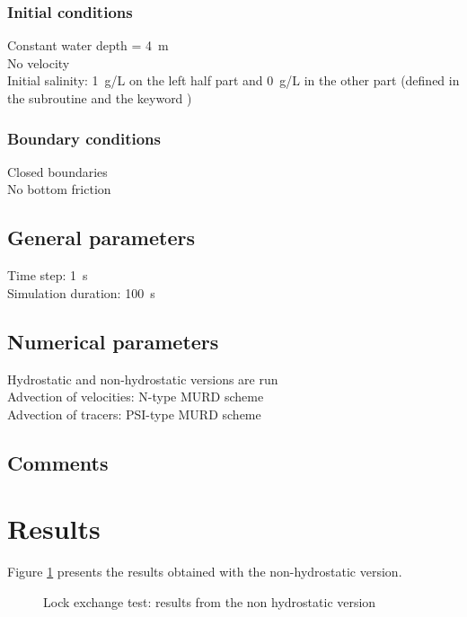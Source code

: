 \subsubsection{Initial conditions}
%
Constant water depth = 4~m\\
No velocity\\
Initial salinity: 1~g/L on the left half part and 0~g/L in the other
part (defined in the subroutine  and the keyword
)
%
\subsubsection{Boundary conditions}
%
Closed boundaries\\
No bottom friction
%
\subsection{General parameters}
%
Time step: 1~s\\
Simulation duration: 100~s
%
%
%
\subsection{Numerical parameters}
%
Hydrostatic and non-hydrostatic versions are run\\
Advection of velocities: N-type MURD scheme\\
Advection of tracers: PSI-type MURD scheme
%
\subsection{Comments}
%
%
%
\section{Results}
%
Figure \ref{t3d:lock-exchange:NH_res} presents the results obtained with
the non-hydrostatic version.

\begin{figure} [H]
\centering
{}
 \caption{Lock exchange test: results from the non hydrostatic version}
 \label{t3d:lock-exchange:NH_res}
\end{figure}

